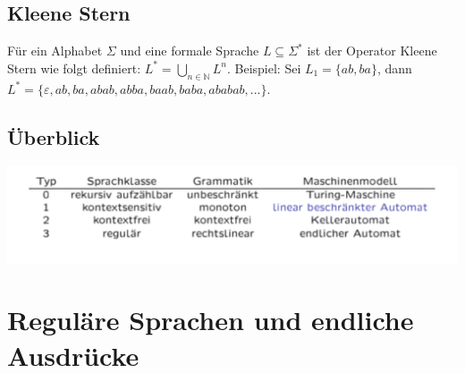 \documentclass[12pt,a4paper]{article}
\begin{document}
\subsection{Kleene Stern}
Für ein Alphabet $\varSigma$ und eine formale Sprache $L \subseteq \varSigma^*$ ist der Operator Kleene Stern wie folgt definiert: $L^* = \underset{n \in \mathbb{N}}{\bigcup} L^n$.\newline \newline
Beispiel: Sei $L_1 = \{ ab, ba\}$, dann $L^* = \{\varepsilon, ab, ba, abab, abba, baab, baba, ababab, ...\}$.

\subsection{Überblick}
\includegraphics[width=\textwidth]{Bilder/Zusammenhang_Sprache_Grammatik_Maschinenmodell.png}

\section{Reguläre Sprachen und endliche Ausdrücke}
\end{document}
